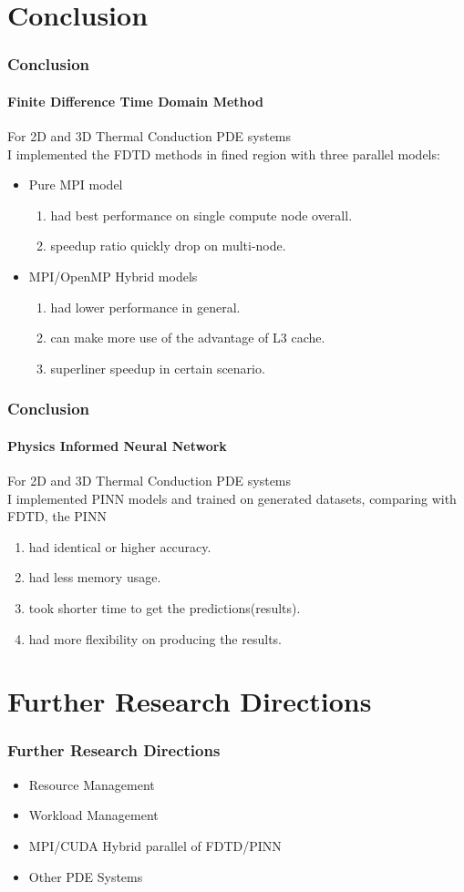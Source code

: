 \section{Conclusion}



\begin{frame}
  \frametitle{Conclusion}
  \framesubtitle{Finite Difference Time Domain Method}
  For 2D and 3D Thermal Conduction PDE systems \\
  I implemented the FDTD methods in fined region with three parallel models:
  \begin{itemize}
    \item Pure MPI model 
    \begin{enumerate}
      \item had best performance on single compute node overall.
      \item speedup ratio quickly drop on multi-node.
    \end{enumerate}
    \item MPI/OpenMP Hybrid models 
    \begin{enumerate}
      \item had lower performance in general.
      \item can make more use of the advantage of L3 cache.
      \item superliner speedup in certain scenario.
    \end{enumerate}
  \end{itemize}

\end{frame}


\begin{frame}
  \frametitle{Conclusion}
  \framesubtitle{Physics Informed Neural Network}
  For 2D and 3D Thermal Conduction PDE systems \\
  I implemented PINN models and trained on generated datasets, comparing with FDTD, the PINN 
  \begin{enumerate}
    \item had identical or higher accuracy.
    \item had less memory usage.
    \item took shorter time to get the predictions(results).
    \item had more flexibility on producing the results.
  \end{enumerate}


\end{frame}


\section{Further Research Directions}
\begin{frame}
  \frametitle{Further Research Directions}
  \begin{itemize}
    \item Resource Management
    \item Workload Management
    \item MPI/CUDA Hybrid parallel of FDTD/PINN
    \item Other PDE Systems
  \end{itemize}
\end{frame}